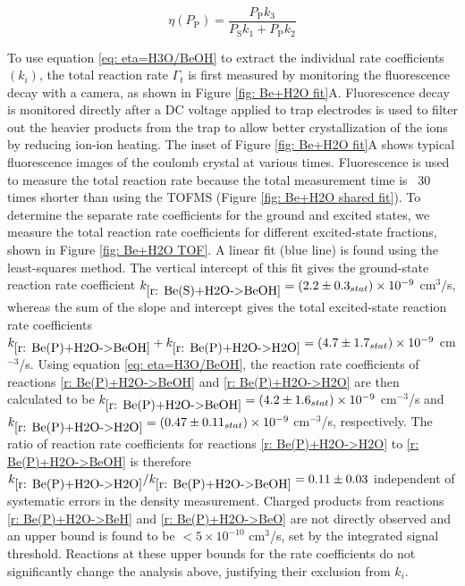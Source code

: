 \begin{equation}
	\eta(P_\text{P}) = \frac{P_\text{P} k_3}{P_\text{S} k_1 + P_\text{P} k_2}
	\label{eq: eta=H3O/BeOH}
\end{equation}

To use equation \ref{eq: eta=H3O/BeOH} to extract the individual rate coefficients $(k_i)$, the total reaction rate $\Gamma_t$ is first measured by monitoring the  fluorescence decay with a camera, as shown in Figure \ref{fig: Be+H2O fit}A. Fluorescence decay is monitored directly after a DC voltage applied to trap electrodes is used to filter out the heavier products from the trap to allow better crystallization of the  ions by reducing ion-ion heating.\cite{Chen2013} The inset of Figure \ref{fig: Be+H2O fit}A shows typical fluorescence images of the  coulomb crystal at various times. Fluorescence is used to measure the total reaction rate because the total measurement time is ~30 times shorter than using the TOFMS (Figure \ref{fig: Be+H2O shared fit}). To determine the separate rate coefficients for the  ground and excited states, we measure the total reaction rate coefficients for different excited-state fractions, shown in Figure \ref{fig: Be+H2O TOF}. A linear fit (blue line) is found using the least-squares method. The vertical intercept of this fit gives the  ground-state reaction rate coefficient $k_{\ref{r: Be(S)+H2O->BeOH}}=(2.2 \pm 0.3_{stat}) \times 10^{-9}$ cm$^3/$s, whereas the sum of the slope and intercept gives the total excited-state  reaction rate coefficients $k_{\ref{r: Be(P)+H2O->BeOH}} + k_{\ref{r: Be(P)+H2O->H2O}} = (4.7 \pm 1.7_{stat}) \times 10^{-9}$ cm$^{-3}$/s. Using equation \ref{eq: eta=H3O/BeOH}, the reaction rate coefficients of reactions \ref{r: Be(P)+H2O->BeOH} and \ref{r: Be(P)+H2O->H2O} are then calculated to be $k_{\ref{r: Be(P)+H2O->BeOH}} = (4.2 \pm 1.6_{stat}) \times 10^{-9}$ cm$^{-3}$/s and $k_{\ref{r: Be(P)+H2O->H2O}} = (0.47 \pm 0.11_{stat}) \times 10^{-9}$ cm$^{-3}$/s, respectively. The ratio of reaction rate coefficients for reactions \ref{r: Be(P)+H2O->H2O} to \ref{r: Be(P)+H2O->BeOH} is therefore $k_{\ref{r: Be(P)+H2O->H2O}}/k_{\ref{r: Be(P)+H2O->BeOH}} = 0.11 \pm 0.03$ independent of systematic errors in the density measurement. Charged products from reactions \ref{r: Be(P)+H2O->BeH} and \ref{r: Be(P)+H2O->BeO} are not directly observed and an upper bound is found to be $<5\times10^{-10}$ cm$^3$/s, set by the integrated signal threshold. Reactions at these upper bounds for the rate coefficients do not significantly change the analysis above, justifying their exclusion from $k_i$.

